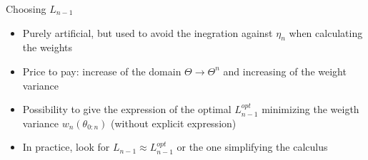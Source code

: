 \begin{frame}{Choosing $L_{n-1}$}

\begin{itemize}
\item Purely artificial, but used to avoid the inegration against  $\eta_n$ when calculating the weights
\item Price to pay: increase of the domain  $\Theta \rightarrow \Theta^n$ and increasing of the weight variance
\item Possibility to give the expression of the optimal $L^{opt}_{n-1}$ minimizing the weigth variance $w_n(\theta_{0:n})$  (without explicit expression)
\item In practice, look for  $L_{n-1} \approx L^{opt}_{n-1}$ or the one simplifying the calculus
\end{itemize}
\end{frame}


